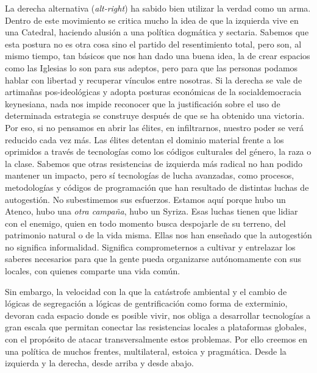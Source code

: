 La derecha alternativa (\emph{alt-right}) ha sabido bien utilizar la verdad como un arma. Dentro de este movimiento se critica mucho la idea de que la izquierda vive en una Catedral, haciendo alusión a una política dogmática y sectaria. Sabemos que esta postura no es otra cosa sino el partido del resentimiento total, pero son, al mismo tiempo, tan básicos que nos han dado una buena idea, la de crear espacios como las Iglesias lo son para sus adeptos, pero para que las personas podamos hablar con libertad y recuperar vínculos entre nosotras. Si la derecha se vale de artimañas pos-ideológicas y adopta posturas económicas de la socialdemocracia keynesiana, nada nos impide reconocer que la justificación sobre el uso de determinada estrategia se construye después de que se ha obtenido una victoria. Por eso, si no pensamos en abrir las élites, en infiltrarnos, nuestro poder se verá reducido cada vez más. Las élites detentan el dominio material frente a los oprimidos a través de tecnologías como los códigos culturales del género, la raza o la clase. Sabemos que otras resistencias de izquierda más radical no han podido mantener un impacto, pero sí tecnologías de lucha avanzadas, como procesos, metodologías y códigos de programación que han resultado de distintas luchas de autogestión. No subestimemos sus esfuerzos. Estamos aquí porque hubo un Atenco, hubo una \emph{otra campaña}, hubo un Syriza. Esas luchas tienen que lidiar con el enemigo, quien en todo momento busca despojarle de su terreno, del patrimonio natural o de la vida misma. Ellas nos han enseñado que la autogestión no significa informalidad. Significa comprometernos a cultivar y entrelazar los saberes necesarios para que la gente pueda organizarse autónomamente con sus locales, con quienes comparte una vida común.

Sin embargo, la velocidad con la que la catástrofe ambiental y el cambio de lógicas de segregación a lógicas de gentrificación como forma de exterminio, devoran cada espacio donde es posible vivir, nos obliga a desarrollar tecnologías a gran escala que permitan conectar las resistencias locales a plataformas globales, con el propósito de atacar transversalmente estos problemas. Por ello creemos en una política de muchos frentes, multilateral, estoica y pragmática. Desde la izquierda y la derecha, desde arriba y desde abajo.

